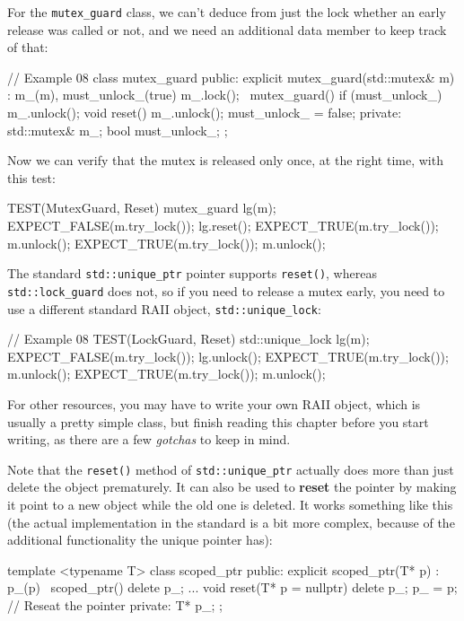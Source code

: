 For the \texttt{mutex\_guard} class, we can't deduce from just the lock whether an early release was called or not, and we need an additional data member to keep track of that:

\begin{code}
// Example 08
class mutex_guard {
  public:
  explicit mutex_guard(std::mutex& m) :
    m_(m), must_unlock_(true) { m_.lock(); }
  ~mutex_guard() { if (must_unlock_) m_.unlock(); }
   void reset() { m_.unlock(); must_unlock_ = false; }
  private:
  std::mutex& m_;
  bool must_unlock_;
};
\end{code}

Now we can verify that the mutex is released only once, at the right time, with this test:

\begin{code}
TEST(MutexGuard, Reset) {
  {
    mutex_guard lg(m);
    EXPECT_FALSE(m.try_lock());
    lg.reset();
    EXPECT_TRUE(m.try_lock()); m.unlock();
  }
  EXPECT_TRUE(m.try_lock()); m.unlock();
}
\end{code}

The standard \texttt{std::unique\_ptr} pointer supports \texttt{reset()}, whereas \texttt{std::lock\_guard} does not, so if you need to release a mutex early, you need to use a different standard RAII object, \texttt{std::unique\_lock}:

\begin{code}
// Example 08
TEST(LockGuard, Reset) {
  {
    std::unique_lock lg(m);
    EXPECT_FALSE(m.try_lock());
    lg.unlock();
    EXPECT_TRUE(m.try_lock()); m.unlock();
  }
  EXPECT_TRUE(m.try_lock()); m.unlock();
}
\end{code}

For other resources, you may have to write your own RAII object, which is usually a pretty simple class, but finish reading this chapter before you start writing, as there are a few \emph{gotchas} to keep in mind.

Note that the \texttt{reset()} method of \texttt{std::unique\_ptr} actually does more than just delete the object prematurely. It can also be used to \textbf{reset} the pointer by making it point to a new object while the old one is deleted. It works something like this (the actual implementation in the standard is a bit more complex, because of the additional functionality the unique pointer has):

\begin{code}
template <typename T> class scoped_ptr {
  public:
  explicit scoped_ptr(T* p) : p_(p) {}
  ~scoped_ptr() { delete p_; }
  ...
  void reset(T* p = nullptr) {
    delete p_; p_ = p;    // Reseat the pointer
  }
  private:
  T* p_;
};
\end{code}

